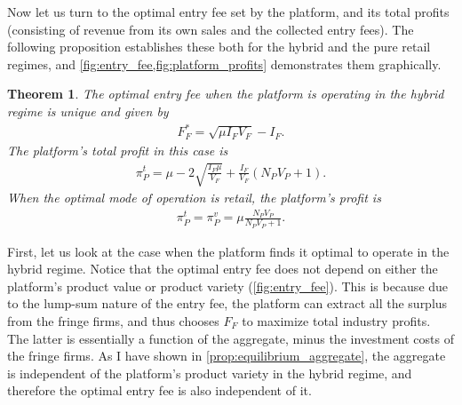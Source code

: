 \documentclass[a4paper]{article}
\newtheorem{theorem}{Theorem}
\begin{document}
Now let us turn to the optimal entry fee set by the platform, and its total profits (consisting of revenue from its own sales and the collected entry fees).
The following proposition establishes these both for the hybrid and the pure retail regimes, and \cref{fig:entry_fee,fig:platform_profits} demonstrates them graphically.

\begin{theorem}
    \label{prop:optimal_entry_fee}
    The optimal entry fee when the platform is operating in the hybrid regime is unique and given by
    \begin{align*}
        F_F^* = \sqrt{\mu I_F V_F} - I_F.
    \end{align*}
    The platform's total profit in this case is
    \begin{align*}
        \pi_P^{t} = \mu - 2\sqrt{\frac{I_F \mu}{V_F}} + \frac{I_F}{V_F} (N_P V_P + 1).
    \end{align*}
    When the optimal mode of operation is retail, the platform's profit is
    \begin{align*}
        \pi_P^{t} = \pi_P^{v} = \mu \frac{ N_P V_P}{N_P V_P + 1}.
    \end{align*}
\end{theorem}

First, let us look at the case when the platform finds it optimal to operate in the hybrid regime.
Notice that the optimal entry fee does not depend on either the platform's product value or product variety (\cref{fig:entry_fee}).
This is because due to the lump-sum nature of the entry fee, the platform can extract all the surplus from the fringe firms, and thus chooses $F_F$ to maximize total industry profits.
The latter is essentially a function of the aggregate, minus the investment costs of the fringe firms.
As I have shown in \cref{prop:equilibrium_aggregate}, the aggregate is independent of the platform's product variety in the hybrid regime, and therefore the optimal entry fee is also independent of it.
\end{document}
